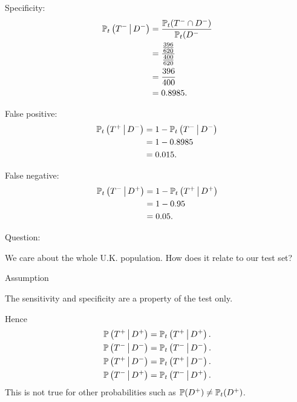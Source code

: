 \documentclass[10pt, a4paper]{article}
\begin{document}
\begin{enumerate}[label = (\roman*)]
    Specificity:
    \begin{align*}
        \P_t\left(T ^ {-} \mmid D ^ {-}\right) &= \frac{\P_t(T ^ {-} \cap D ^ {-})}{\P_t(D ^ {-}} \\
        &= \frac{\frac{396}{620}}{\frac{400}{620}} \\
        &= \frac{396}{400} \\
        &= 0.8985.
    \end{align*}

    False positive:
    \begin{align*}
        \P_t\left(T ^ {+} \mmid D ^ {-}\right) &= 1 - \P_t\left(T ^ {-} \mmid D ^ {-}\right) \\
        &= 1 - 0.8985 \\
        &= 0.015.
    \end{align*}

    False negative:
    \begin{align*}
        \P_t\left(T ^ {-} \mmid D ^ {+}\right) &= 1 - \P_t\left(T ^ {+} \mmid D ^ {+}\right) \\
        &= 1 - 0.95 \\
        &= 0.05.
    \end{align*}

    Question:

    We care about the whole U.K. population.
    How does it relate to our test set?

    Assumption

    The sensitivity and specificity are a property of the test only.

    Hence
    \begin{align*}
        \P\left(T ^ {+} \mmid D ^ {+}\right) &= \P_t\left(T ^ {+} \mmid D ^ {+}\right). \\
        \P\left(T ^ {-} \mmid D ^ {-}\right) &= \P_t\left(T ^ {-} \mmid D ^ {-}\right). \\
        \P\left(T ^ {+} \mmid D ^ {-}\right) &= \P_t\left(T ^ {+} \mmid D ^ {-}\right). \\
        \P\left(T ^ {-} \mmid D ^ {+}\right) &= \P_t\left(T ^ {-} \mmid D ^ {+}\right).
    \end{align*}
    This is not true for other probabilities such as $\P(D ^ {+}) \neq \P_t(D ^ {+})$.
\end{enumerate}
\end{document}
